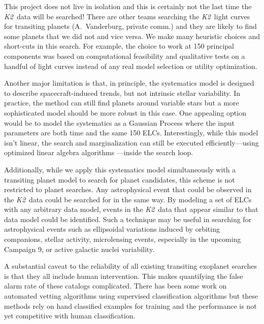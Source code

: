 \documentclass[12pt,preprint]{aastex}
\newcommand{\project}[1]{\textsl{#1}} %
\newcommand{\KT}{\project{K2}}
\begin{document}
This project does not live in isolation and this is certainly not the last
time the \KT\ data will be searched!
There are other teams searching the \KT\ light curves for transiting planets
(A.~Vanderburg, private comm.) and they are likely to find some planets that
we did not and vice versa.
We make many heuristic choices and short-cuts in this search.
For example, the choice to work at 150 principal components was based on
computational feasibility and qualitative tests on a handful of light curves
instead of any real model selection or utility optimization.

Another major limitation is that, in principle, the systematics model is
designed to describe spacecraft-induced trends, but not intrinsic stellar
variability.
In practice, the method can still find planets around variable stars but a
more sophisticated model should be more robust in this case.
One appealing option would be to model the systematics as a Gaussian Process
where the input parameters are both time and the same 150 ELCs.
Interestingly, while this model isn't linear, the search and marginalization
can still be executed efficiently---using optimized linear algebra algorithms
\citep[][Foreman-Mackey et al.\ in preparation]{Ambikasaran:2014}---inside the
search loop.

Additionally, while we apply this systematics model simultaneously with a
transiting planet model to search for planet candidates, this scheme is
not restricted to planet searches.
Any astrophysical event that could be observed in the \KT\ data could be
searched for in the same way.
By modeling a set of ELCs with any arbitrary data model, events in the \KT\
data that appear similar to that data model could be identified.
Such a technique may be useful in searching for astrophysical events such as
ellipsoidal variations induced by orbiting companions,
stellar activity,
microlensing events, especially in the upcoming Campaign 9,
or
active galactic nuclei variability.



A substantial caveat to the reliability of all existing transiting exoplanet
searches is that they all include human intervention.
This makes quantifying the false alarm rate of these catalogs complicated.
There has been some work on automated vetting algorithms using supervised
classification algorithms \citep{McCauliff:2014, Jenkins:2014} but these
methods rely on hand classified examples for training and the performance is
not yet competitive with human classification.
\end{document}
